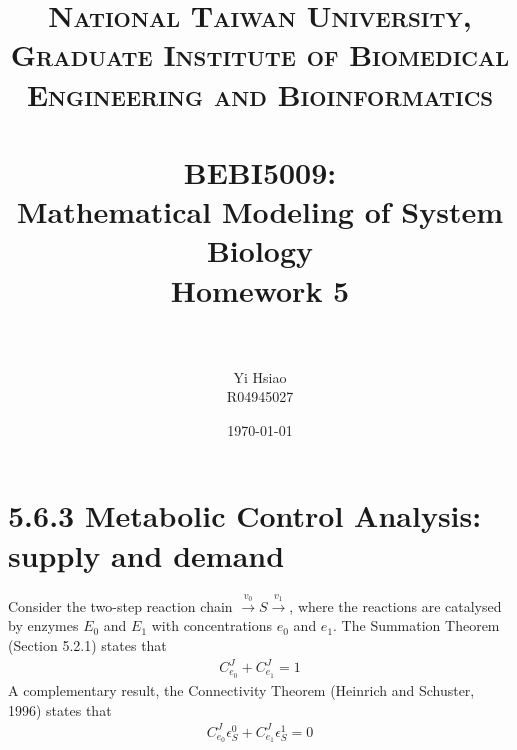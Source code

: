 \documentclass[paper=a4, fontsize=11pt]{scrartcl} %
\title{	
\normalfont \normalsize 
\textsc{National Taiwan University, \\ Graduate Institute of Biomedical Engineering and Bioinformatics} \\ [25pt] %
\horrule{0.5pt} \\[0.4cm] %
\huge BEBI5009:\\Mathematical Modeling of System Biology \\ Homework 5 \\ %
\horrule{2pt} \\[0.5cm] %
}
\author{Yi Hsiao\\R04945027} %
\date{\normalsize\today} %
\numberwithin{equation}{section} %
\numberwithin{figure}{section} %
\numberwithin{table}{section} %
\begin{document}
\maketitle %

\newpage
\section{5.6.3 Metabolic Control Analysis: supply and demand}
	Consider the two-step reaction chain $\xrightarrow{v_0}S\xrightarrow{v_1}$, where the reactions are catalysed by enzymes $E_0$ and $E_1$ with concentrations $e_0$ and $e_1$. The Summation Theorem (Section 5.2.1) states that
	\begin{align*}
		C_{e_0}^J+C_{e_1}^J=1
	\end{align*}
	A complementary result, the Connectivity Theorem (Heinrich and Schuster, 1996) states that
	\begin{align*}
		C_{e_0}^J\epsilon_S^0+C_{e_1}^J\epsilon_S^1=0
	\end{align*}
\end{document}
